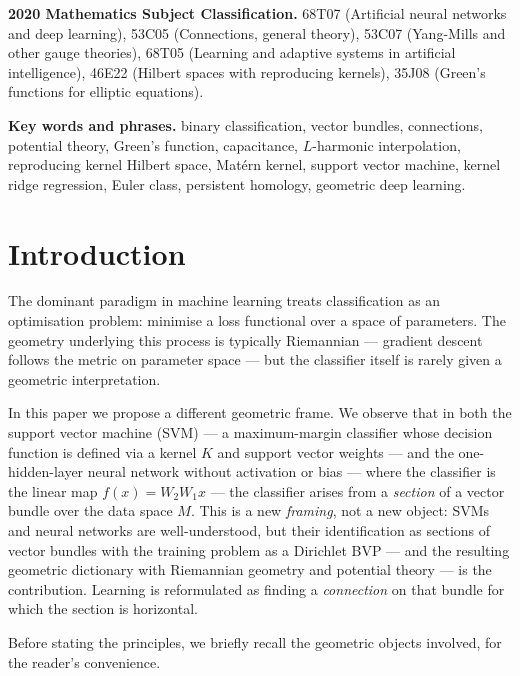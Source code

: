 \documentclass[11pt, a4paper]{article}
\theoremstyle{plain}
\theoremstyle{definition}
\begin{document}
\noindent\textbf{2020 Mathematics Subject Classification.}
68T07 (Artificial neural networks and deep learning),
53C05 (Connections, general theory),
53C07 (Yang-Mills and other gauge theories),
68T05 (Learning and adaptive systems in artificial intelligence),
46E22 (Hilbert spaces with reproducing kernels),
35J08 (Green's functions for elliptic equations).

\noindent\textbf{Key words and phrases.}
binary classification, vector bundles, connections, potential theory, Green's
function, capacitance, $L$-harmonic interpolation, reproducing kernel Hilbert
space, Mat\'ern kernel, support vector machine, kernel ridge regression,
Euler class, persistent homology, geometric deep learning.

\bigskip

\bigskip

\section{Introduction}

The dominant paradigm in machine learning treats classification as an optimisation
problem: minimise a loss functional over a space of parameters. The geometry
underlying this process is typically Riemannian --- gradient descent follows the
metric on parameter space --- but the classifier itself is rarely given a geometric
interpretation.

In this paper we propose a different geometric frame. We observe that in both the
support vector machine (SVM) --- a maximum-margin classifier whose decision function
is defined via a kernel $K$ and support vector weights --- and the one-hidden-layer
neural network without activation or bias --- where the classifier is the linear map
$f(x) = W_2 W_1 x$ --- the classifier arises from a \emph{section} of a vector
bundle over the data space $M$. This is a new \emph{framing}, not a new object:
SVMs and neural networks are well-understood, but their identification as sections
of vector bundles with the training problem as a Dirichlet BVP --- and the resulting
geometric dictionary with Riemannian geometry and potential theory --- is the
contribution. Learning is reformulated as finding a \emph{connection} on that
bundle for which the section is horizontal.

Before stating the principles, we briefly recall the geometric objects involved,
for the reader's convenience.
\end{document}
